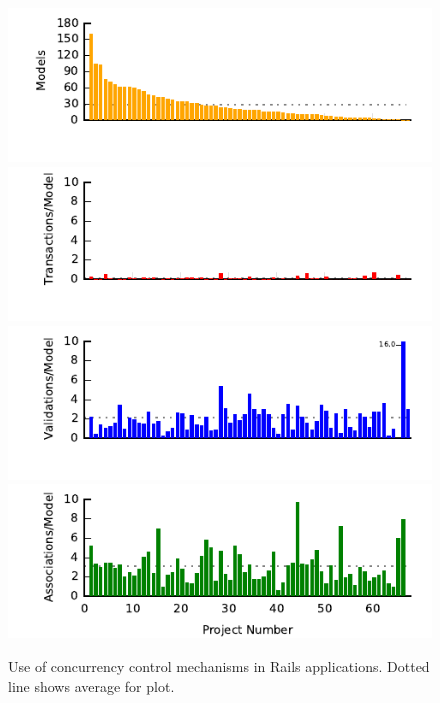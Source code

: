 \begin{figure}
  \newcommand{\skipht}{\\[-2em]}
\includegraphics[width=\columnwidth]{figs/models-single-bar.pdf}\skipht
\includegraphics[width=\columnwidth]{figs/transactions-single-bar.pdf}\skipht
\includegraphics[width=\columnwidth]{figs/validations-single-bar.pdf}\skipht
\includegraphics[width=\columnwidth]{figs/associations-single-bar.pdf}\skipht
\caption{Use of concurrency control mechanisms in Rails
  applications. Dotted line shows average for plot.}
\label{fig:usages}
\end{figure}



